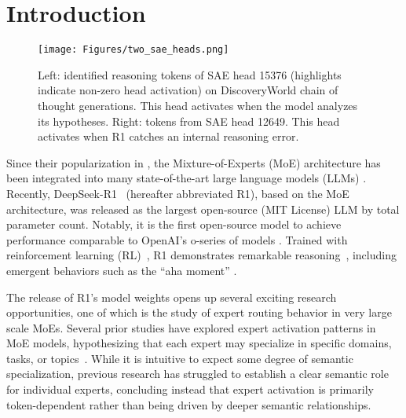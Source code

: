 \section{Introduction}

\begin{figure*}[t]
    \centering
    \texttt{[image: Figures/two\_sae\_heads.png]} 
    \caption{Left: identified reasoning tokens of SAE head 15376 (highlights indicate non-zero head activation) on DiscoveryWorld chain of thought generations. This head activates when the model analyzes its hypotheses. Right: tokens from SAE head 12649. This head activates when R1 catches an internal reasoning error.}
    \label{fig:two_sae_heads_text_example}
    \vspace{-1em}
\end{figure*}

\renewcommand\thefootnote{}  %
Since their popularization in \citet{fedus2022switch}, the Mixture-of-Experts (MoE) architecture \citep{ jacobs1991adaptive} has been integrated into many state-of-the-art large language models (LLMs) \citep{lieber2024jamba,jiang2024mixtral,liu2024deepseek}. 
Recently, DeepSeek-R1~\cite{guo2025deepseek} (hereafter abbreviated R1), based on the MoE architecture, was released as the largest open-source (MIT License) LLM by total parameter count.
Notably, it is the first open-source model to achieve performance comparable to OpenAI’s o-series of models \citep{zhong2024evaluation}.
Trained with reinforcement learning (RL)~\cite{shao2024deepseekmath}, R1 demonstrates remarkable reasoning~\cite{wei2022chain}, %
including emergent behaviors such as the ``aha moment'' \citep{guo2025deepseek}.

The release of R1's  model weights opens up several exciting research opportunities, one of which is the study of expert routing behavior in very large scale MoEs. 
Several prior studies have explored expert activation patterns in MoE models, hypothesizing that each expert may specialize in specific domains, tasks, or topics~\cite{zoph2022stmoe,jiang2024mixtral,xue2024openmoe}. 
While it is intuitive to expect some degree of semantic specialization, previous research has struggled to establish a clear semantic role for individual experts, concluding instead that expert activation is primarily token-dependent rather than being driven by deeper semantic relationships.


